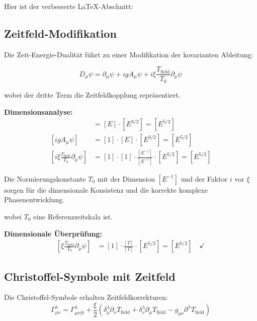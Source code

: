 \documentclass[12pt,a4paper]{report}
\begin{document}
Hier ist der verbesserte LaTeX-Abschnitt:


\subsection{Zeitfeld-Modifikation}
\label{subsec:time_field_modification}

Die Zeit-Energie-Dualität führt zu einer Modifikation der kovarianten Ableitung:

\begin{equation}
	D_\mu \psi = \partial_\mu \psi + ig A_\mu \psi + i\xi \frac{T_{\text{field}}}{T_0} \partial_\mu \psi
\end{equation}

wobei der dritte Term die Zeitfeldkopplung repräsentiert.

\textbf{Dimensionsanalyse:}
\begin{align}
	[\partial_\mu \psi] &= [E] \cdot [E^{3/2}] = [E^{5/2}] \\
	[ig A_\mu \psi] &= [1] \cdot [E] \cdot [E^{3/2}] = [E^{5/2}] \\
	[i\xi \frac{T_{\text{field}}}{T_0} \partial_\mu \psi] &= [1] \cdot [1] \cdot \frac{[E^{-1}]}{[E^{-1}]} \cdot [E^{5/2}] = [E^{5/2}]
\end{align}

Die Normierungskonstante $T_0$ mit der Dimension $[E^{-1}]$ und der Faktor $i$ vor $\xi$ sorgen für die dimensionale Konsistenz und die korrekte komplexe Phasenentwicklung.

	
	wobei $T_0$ eine Referenzzeitskala ist.
	
	\textbf{Dimensionale Überprüfung:}
	\begin{align}
		\left[\xi \frac{T_{\text{field}}}{T_0} \partial_\mu \psi\right] &= [1] \cdot \frac{[T]}{[T]} \cdot [E^{5/2}] = [E^{5/2}] \quad \checkmark
	\end{align}
	
\subsection{Christoffel-Symbole mit Zeitfeld}
\label{subsec:christoffel_time_field}

Die Christoffel-Symbole erhalten Zeitfeldkorrekturen:
\begin{equation}
	\Gamma^\lambda_{\mu\nu} = \Gamma^\lambda_{\mu\nu|0} + \frac{\xi}{2} \left(\delta^\lambda_\mu \partial_\nu T_{\text{field}} + \delta^\lambda_\nu \partial_\mu T_{\text{field}} - g_{\mu\nu} \partial^\lambda T_{\text{field}}\right)
\end{equation}
\end{document}
